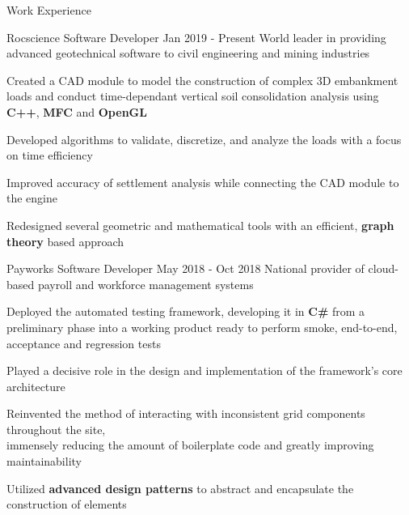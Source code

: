 \documentclass{resume} %
\begin{document}
\begin{rSection}{Work Experience}
    
    \begin{workexperience}
        {Rocscience}
        {Software Developer}
        {Jan 2019 - Present}
        {World leader in providing advanced geotechnical software to civil engineering and mining industries}
        {
            \item Created a CAD module to model the construction of complex 3D embankment loads and 
            conduct time-dependant vertical soil consolidation analysis using \textbf{C++}, \textbf{MFC} and \textbf{OpenGL}
            \item Developed algorithms to validate, discretize, and analyze the loads with a focus on time efficiency
            \item Improved accuracy of settlement analysis while connecting the CAD module to the engine
            \item Redesigned several geometric and mathematical tools with an efficient, \textbf{graph theory} based approach
        }
    \end{workexperience}

    \vspace{1em}
    
    \begin{workexperience}
        {Payworks}
        {Software Developer}
        {May 2018 - Oct 2018}
        {National provider of cloud-based payroll and workforce management systems}
        {
            \item Deployed the automated testing framework, developing it in \textbf{C\#} from a preliminary phase into a working product ready to perform smoke, end-to-end, acceptance and regression tests
            \item Played a decisive role in the design and implementation of the framework's core architecture
            \item Reinvented the method of interacting with inconsistent grid components throughout the site, \\immensely reducing the amount of boilerplate code and greatly improving maintainability
            \item Utilized \textbf{advanced design patterns} to abstract and encapsulate the construction of elements
        }
    \end{workexperience}

    \vspace{1em}


\end{rSection}
\end{document}
